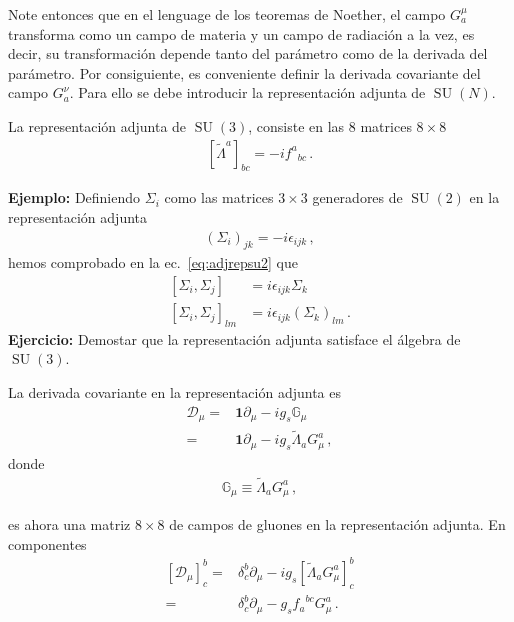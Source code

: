 Note entonces que en el lenguage de los teoremas de Noether, el campo $G^{\mu}_{a}$ transforma como un campo de materia y un campo de radiación a la vez, es decir, su transformación depende tanto del parámetro como de la derivada del parámetro. Por consiguiente, es conveniente definir la derivada covariante del campo $G^{\nu}_{a}$. Para ello se debe introducir la representación adjunta de $\operatorname{SU}(N)$.

\begin{frame}
La representación adjunta de $\operatorname{SU}(3)$, consiste en las 8 matrices $8\times 8$
\begin{align}
  \left[  \widetilde{\Lambda}^{a}\right]_{bc}=-i {f^{a}}_{bc}\,.
\end{align}
\end{frame}

\noindent
\textbf{Ejemplo:} Definiendo $\Sigma_i$ como las matrices $3\times3$ generadores de $\operatorname{SU}(2)$ en la representaci\'on adjunta
\begin{align}
  (\Sigma_i)_{jk}=-i\epsilon_{ijk}\,,
\end{align}
hemos comprobado en la ec.~\eqref{eq:adjrepsu2} que
\begin{align}
  \left[{\Sigma_i},{\Sigma_j}\right]&=i\epsilon_{ijk}{\Sigma_k}\nonumber\\
  \left[{\Sigma_i},{\Sigma_j}\right]_{lm}&=i\epsilon_{ijk}(\Sigma_k)_{lm}\,.
\end{align}
\noindent
\textbf{Ejercicio:} Demostar que la representación adjunta satisface el álgebra de $\operatorname{SU}(3)$.

\begin{frame}
La derivada covariante en la representación adjunta es
\begin{align}
  \mathcal{D}_{\mu}=&\mathbf{1}\partial_{\mu}-i g_s \mathbb{G}_{\mu}  \nonumber\\
=&\mathbf{1}\partial_{\mu}-i g_s \widetilde{\Lambda}_a G_{\mu}^{a} \,,
\end{align}
donde
\begin{align}
  \mathbb{G}_{\mu}\equiv \widetilde{\Lambda}_a G_{\mu}^{a}\,,
\end{align}
\end{frame}
es ahora una matriz $8\times8$ de campos de gluones en la representación adjunta. En componentes
\begin{align}
 \left[\mathcal{D}_{\mu} \right]^b_c=&\delta^b_c\partial_{\mu}-i g_{s}\left[ \widetilde{\Lambda}_{a} G^a_{\mu} \right]^b_c \nonumber\\
                  =&\delta^b_c\partial_{\mu}- g_{s} {f_{a}}^{bc}  G^a_{\mu} \,.
\end{align}

